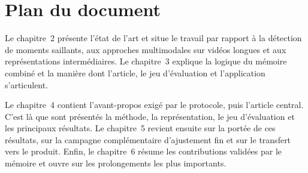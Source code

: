 \section{Plan du document}

Le chapitre~2 pr\'esente l'\'etat de l'art et situe le travail par rapport \`a la d\'etection de moments saillants, aux approches multimodales sur vid\'eos longues et aux repr\'esentations interm\'ediaires. Le chapitre~3 explique la logique du m\'emoire combin\'e et la mani\`ere dont l'article, le jeu d'\'evaluation et l'application s'articulent.

Le chapitre~4 contient l'avant-propos exig\'e par le protocole, puis l'article central. C'est l\`a que sont pr\'esent\'es la m\'ethode, la repr\'esentation, le jeu d'\'evaluation et les principaux r\'esultats. Le chapitre~5 revient ensuite sur la port\'ee de ces r\'esultats, sur la campagne compl\'ementaire d'ajustement fin et sur le transfert vers le produit. Enfin, le chapitre~6 r\'esume les contributions valid\'ees par le m\'emoire et ouvre sur les prolongements les plus importants.
